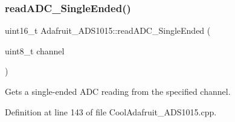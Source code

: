 \subsubsection{\texorpdfstring{read\+A\+D\+C\+\_\+\+Single\+Ended()}{readADC\_SingleEnded()}}
{\footnotesize\ttfamily uint16\+\_\+t Adafruit\+\_\+\+A\+D\+S1015\+::read\+A\+D\+C\+\_\+\+Single\+Ended (\begin{DoxyParamCaption}\item[{uint8\+\_\+t}]{channel }\end{DoxyParamCaption})}



Gets a single-\/ended A\+DC reading from the specified channel. 



Definition at line 143 of file Cool\+Adafruit\+\_\+\+A\+D\+S1015.\+cpp.


